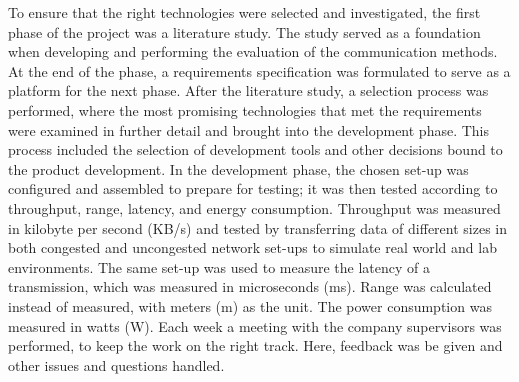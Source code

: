 To ensure that the right technologies were selected and investigated,
	the first phase of the project was a literature study.
The study served as a foundation when developing and performing the evaluation of the communication methods.
At the end of the phase,
	a requirements specification was formulated to serve as a platform for the next phase.
After the literature study,
	a selection process was performed,
	where the most promising technologies that met the requirements were examined in further detail and brought into the development phase.
This process included the selection of development tools and other decisions bound to the product development.
In the development phase,
	the chosen set-up was configured and assembled to prepare for testing;
	it was then tested according to throughput,
	range,
	latency,
	and energy consumption.
Throughput was measured in kilobyte per second (KB/s) and tested by transferring data of different sizes in both congested and uncongested network set-ups to simulate real world and lab environments.
The same set-up was used to measure the latency of a transmission,
	which was measured in microseconds (ms).
Range was calculated instead of measured,
	with meters (m) as the unit.
The power consumption was measured in watts (W).
Each week a meeting with the company supervisors was performed,
	to keep the work on the right track.
Here,
	feedback was be given and other issues and questions handled.




